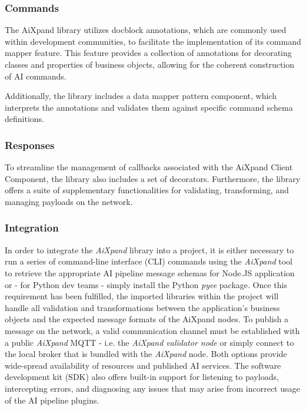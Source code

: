 \documentclass{article}
\begin{document}
\subsubsection{Commands}
The AiXpand library utilizes docblock annotations, which are commonly used within development communities, to facilitate the implementation of its command mapper feature. This feature provides a collection of annotations for decorating classes and properties of business objects, allowing for the coherent construction of AI commands. 

Additionally, the library includes a data mapper pattern component, which interprets the annotations and validates them against specific command schema definitions. 

\subsubsection{Responses}
To streamline the management of callbacks associated with the AiXpand Client Component, the library also includes a set of decorators. Furthermore, the library offers a suite of supplementary functionalities for validating, transforming, and managing payloads on the network.

\subsubsection{Integration}

In order to integrate the \textit{AiXpand} library into a project, it is either necessary to run a series of command-line interface (CLI) commands using the \textit{AiXpand} tool to retrieve the appropriate AI pipeline message schemas for Node.JS application or - for Python dev teams - simply install the Python \textit{pyee} package. Once this requirement has been fulfilled, the imported libraries within the project will handle all validation and transformations between the application's business objects and the expected message formats of the AiXpand nodes. To publish a message on the network, a valid communication channel must be established with a public \textit{AiXpand} MQTT - i.e. the \textit{AiXpand validator node} or simply connect to the local broker that is bundled with the \textit{AiXpand} node. Both options provide wide-spread availability of resources and published AI services. The software development kit (SDK) also offers built-in support for listening to payloads, intercepting errors, and diagnosing any issues that may arise from incorrect usage of the AI pipeline plugins.
\end{document}
